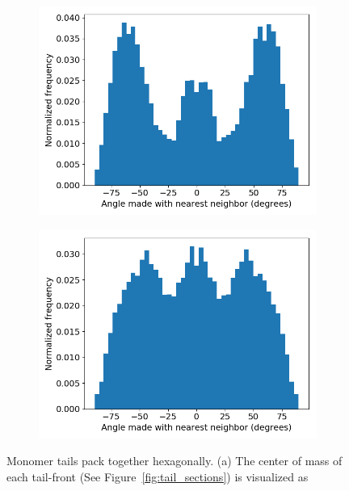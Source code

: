 \documentclass{article}
\begin{document}
\begin{figure}[!htb]
\begin{subfigure}{0.45\textwidth}
        \caption{}\label{fig:tail_fronts}
        \end{subfigure}
        \begin{subfigure}{0.45\textwidth}
        \includegraphics[width=\textwidth]{hexagonal_tail_packing_middles.png}
        \caption{}\label{fig:tail_middles}
        \end{subfigure}
        \begin{subfigure}{0.45\textwidth}
        \includegraphics[width=\textwidth]{hexagonal_tail_packing_ends.png}
        \caption{}\label{fig:tail_ends}
        \end{subfigure}
        \caption{Monomer tails pack together hexagonally. (a) The center of mass
        of each tail-front (See Figure~\ref{fig:tail_sections}) is visualized as
}
\end{figure}
\end{document}

